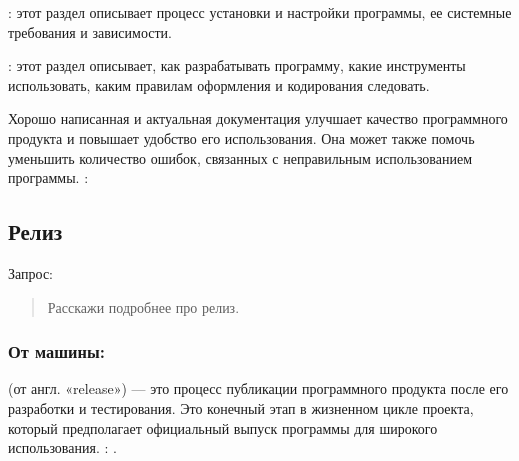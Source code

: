 \documentclass[letterpaper,10pt,russian]{sphinxmanual}
\begin{document}
\sphinxAtStartPar
{}: этот раздел описывает процесс установки и настройки программы, ее системные требования и зависимости.

\sphinxAtStartPar
{}: этот раздел описывает, как разрабатывать программу, какие инструменты использовать, каким правилам оформления и кодирования следовать.

\sphinxAtStartPar
Хорошо написанная и актуальная документация улучшает качество программного продукта и повышает удобство его использования. Она может также помочь уменьшить количество ошибок, связанных с неправильным использованием программы. : 


\subsection{Релиз}
\label{\detokenize{educational_materials/stages/content:id17}}
\sphinxAtStartPar
Запрос:
\begin{quote}

\sphinxAtStartPar
Расскажи подробнее про релиз.
\end{quote}


\subsubsection{От машины:}
\label{\detokenize{educational_materials/stages/content:id18}}
\sphinxAtStartPar
{} (от англ. «release») — это процесс публикации программного продукта после его разработки и тестирования. Это конечный этап в жизненном цикле проекта, который предполагает официальный выпуск программы для широкого использования. : .
\end{document}
